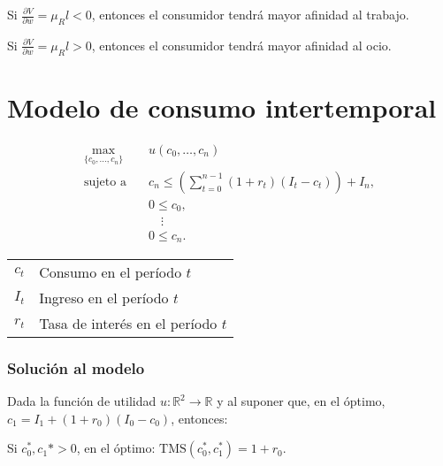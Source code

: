 \documentclass[8pt,a4paper]{extarticle}
\begin{document}
\begin{multicols}{3}
\begin{eqlist}
\item Si $\displaystyle \frac{\partial V}{\partial w} = \mu_R l < 0$, entonces el consumidor tendrá mayor afinidad al trabajo.
\item Si $\displaystyle \frac{\partial V}{\partial w} = \mu_R l > 0$, entonces el consumidor tendrá mayor afinidad al ocio.
\end{eqlist}

\newpage

\section{Modelo de consumo intertemporal}

\begin{equation*}
\begin{aligned}
	\max_{\{c_0, \ldots, c_n\}}\	  & u(c_0, \ldots, c_n) \\
	\text{sujeto a} \quad & c_n \le \left(\sum_{t=0}^{n-1} (1 + r_t)(I_t - c_t) \right) + I_n, \\
						  & 0 \le c_0, \\
						  & \quad \vdots \\
						  & 0 \le c_n.
\end{aligned}
\end{equation*}

\begin{center}
\begin{tabular}{ c l }
	\hline
	$c_t$ & Consumo en el período $t$ \\
	$I_t$ & Ingreso en el período $t$ \\
	$r_t$ & Tasa de interés en el período $t$ \\
	\hline
\end{tabular}
\end{center}

\subsubsection*{Solución al modelo}

Dada la función de utilidad $u : \mathbb{R}^2 \to \mathbb{R}$ y al suponer que, en el óptimo, $c_1 = I_1 + (1 + r_0) (I_0 - c_0)$, entonces:

\begin{bulletlist}
\item Si $c_0^*, c_1* > 0$, en el óptimo: $\text{TMS} (c_0^*, c_1^*) = 1 + r_0$.
\end{bulletlist}


\end{multicols}
\end{document}
